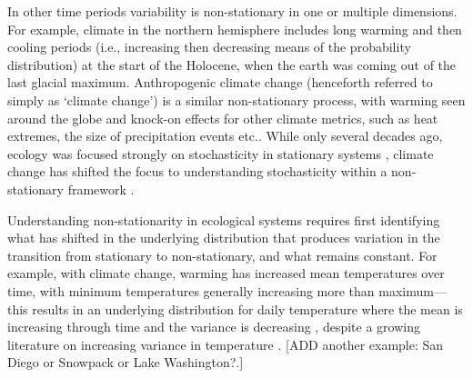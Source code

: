 \documentclass[11pt,letterpaper]{article}
\begin{document}
In other time periods variability is non-stationary in one or multiple dimensions. For example, climate in the northern hemisphere includes long warming and then cooling periods (i.e., increasing then decreasing means of the probability distribution) at the start of the Holocene, when the earth was coming out of the last glacial maximum. Anthropogenic climate change (henceforth referred to simply as `climate change') is a similar non-stationary process, with warming seen around the globe and knock-on effects for other climate metrics, such as heat extremes, the size of precipitation events etc.. While only several decades ago, ecology was focused strongly on stochasticity in stationary systems \citep[e.g.,][]{Ripa1996,Kaitala1997}, climate change has shifted the focus to understanding stochasticity within a non-stationary framework \citep[e.g.,]{cazwavelets,ehrlen2016}.

Understanding non-stationarity in ecological systems requires first identifying what has shifted in the underlying distribution that produces variation in the transition from stationary to non-stationary, and what remains constant. For example, with climate change, warming has increased mean temperatures over time, with minimum temperatures generally increasing more than maximum---this results in an underlying distribution for daily temperature where the mean is increasing through time and the variance is decreasing \citep{ipcc2013,screen2014}, despite a growing literature on increasing variance in temperature \citep[e.g.,][]{vasseur2014}. [ADD another example: San Diego or Snowpack or Lake Washington?.]  %
\end{document}

